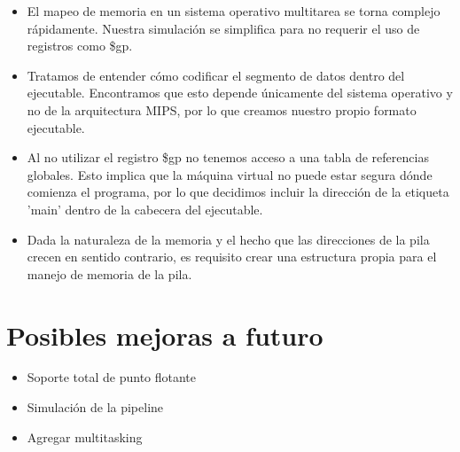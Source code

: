\documentclass[12pt]{article}
\begin{document}
\begin{itemize}

\item	El mapeo de memoria en un sistema operativo multitarea se torna complejo rápidamente. Nuestra simulación se simplifica para no requerir el uso de registros como \$gp. %

\item	Tratamos de entender cómo codificar el segmento de datos dentro del ejecutable. Encontramos que esto depende únicamente del sistema operativo y no de la arquitectura MIPS, por lo que creamos nuestro propio formato ejecutable. %

\item	Al no utilizar el registro \$gp no tenemos acceso a una tabla de referencias globales. Esto implica que la máquina virtual no puede estar segura dónde comienza el programa, por lo que decidimos incluir la dirección de la etiqueta 'main' dentro de la cabecera del ejecutable.



\item	Dada la naturaleza de la memoria y el hecho que las direcciones de la pila crecen en sentido contrario, es requisito crear una estructura propia para el manejo de memoria de la pila.

\end{itemize}



\section{Posibles mejoras a futuro}

\begin{itemize}

\item Soporte total de punto flotante

\item Simulación de la pipeline

\item Agregar multitasking

\end{itemize}
\end{document}
